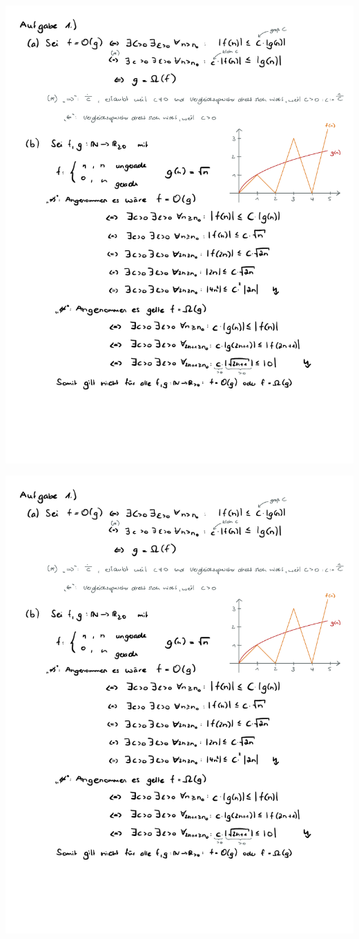 \documentclass[a4paper,oneside,11pt]{scrartcl}
\begin{document}
\begin{minipage}[t]{\textwidth}
\includegraphics[scale = 0.75, page=3]{AlMa1_Zettel04.pdf}
\end{minipage}
\pagebreak
\begin{minipage}[t]{\textwidth}
\includegraphics[scale = 0.75, page=4]{AlMa1_Zettel04.pdf}
\end{minipage}
\end{document}
